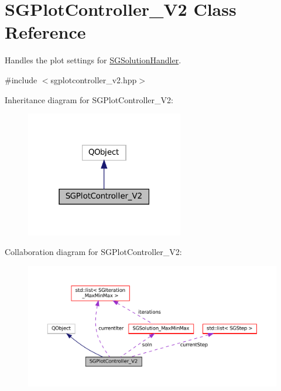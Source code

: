 \hypertarget{classSGPlotController__V2}{}\section{S\+G\+Plot\+Controller\+\_\+\+V2 Class Reference}
\label{classSGPlotController__V2}


Handles the plot settings for \hyperlink{classSGSolutionHandler}{S\+G\+Solution\+Handler}.  




{\ttfamily \#include $<$sgplotcontroller\+\_\+v2.\+hpp$>$}



Inheritance diagram for S\+G\+Plot\+Controller\+\_\+\+V2\+:
\nopagebreak
\begin{figure}[H]
\begin{center}
\leavevmode
\includegraphics[width=195pt]{classSGPlotController__V2__inherit__graph}
\end{center}
\end{figure}


Collaboration diagram for S\+G\+Plot\+Controller\+\_\+\+V2\+:
\nopagebreak
\begin{figure}[H]
\begin{center}
\leavevmode
\includegraphics[width=350pt]{classSGPlotController__V2__coll__graph}
\end{center}
\end{figure}
